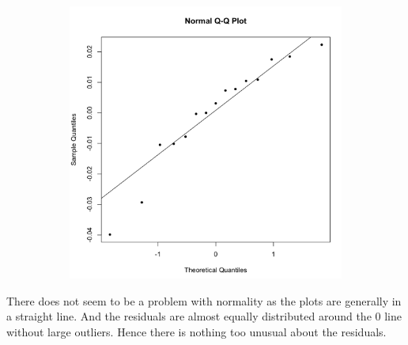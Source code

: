 \documentclass[11pt]{article}
\begin{document}
\begin{figure}[H]
\begin{subfigure}{0.45\textwidth}
        \includegraphics[width=\textwidth]{../pictures/hw3_q2_nf.png}
    \end{subfigure}
\end{figure}

There does not seem to be a problem with normality as the plots are generally in a straight line.
And the residuals are almost equally distributed around the 0 line without large outliers. Hence there is nothing too unusual about the residuals.
\end{document}
